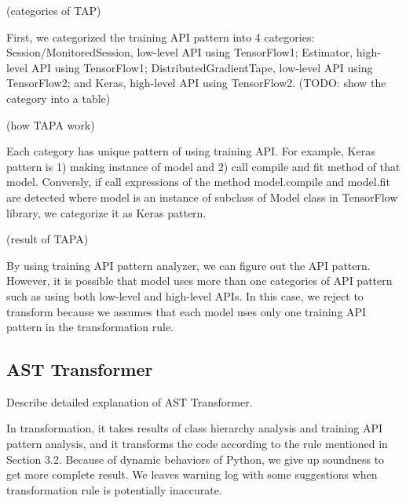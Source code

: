 (categories of TAP)

First, we categorized the training API pattern into 4 categories:
Session/MonitoredSession, low-level API using TensorFlow1;
Estimator, high-level API using TensorFlow1;
DistributedGradientTape, low-level API using TensorFlow2;
and Keras, high-level API using TensorFlow2.
(TODO: show the category into a table)

(how TAPA work)

Each category has unique pattern of using training API.
For example, Keras pattern is 1) making instance of model and
2) call compile and fit method of that model.
Conversly, if call expressions of the method model.compile and model.fit are detected
where model is an instance of subclass of Model class in TensorFlow library,
we categorize it as Keras pattern.

(result of TAPA)

By using training API pattern analyzer, we can figure out the API pattern.
However, it is possible that model uses more than one categories of API pattern
such as using both low-level and high-level APIs.
In this case, we reject to transform because we assumes
that each model uses only one training API pattern in the transformation rule.

\subsection{AST Transformer}
Describe detailed explanation of AST Transformer.

In transformation, it takes results of class hierarchy analysis
and training API pattern analysis, and it transforms the code
according to the rule mentioned in Section 3.2.
Because of dynamic behaviors of Python, we give up soundness
to get more complete result.
We leaves warning log with some suggestions
when transformation rule is potentially inaccurate.

